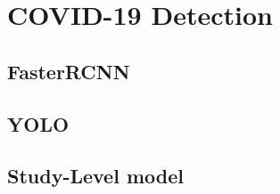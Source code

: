 \chapter{COVID-19 Detection}\label{chapter:detection}


\section{FasterRCNN}
 
\section{YOLO}
 
\section{Study-Level model}

